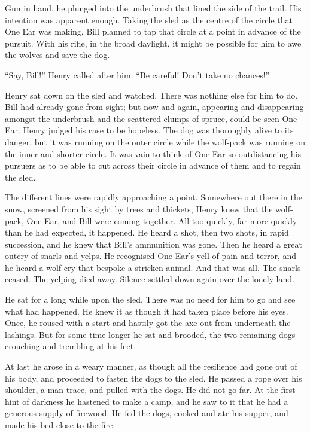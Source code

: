 \documentclass[10pt]{book}
\begin{document}
Gun in hand, he plunged into the underbrush that lined the side of the
trail. His intention was apparent enough. Taking the sled as the centre
of the circle that One Ear was making, Bill planned to tap that circle
at a point in advance of the pursuit. With his rifle, in the broad
daylight, it might be possible for him to awe the wolves and save the
dog.

“Say, Bill!” Henry called after him. “Be careful! Don’t take no
chances!”

Henry sat down on the sled and watched. There was nothing else for him
to do. Bill had already gone from sight; but now and again, appearing
and disappearing amongst the underbrush and the scattered clumps of
spruce, could be seen One Ear. Henry judged his case to be hopeless.
The dog was thoroughly alive to its danger, but it was running on the
outer circle while the wolf-pack was running on the inner and shorter
circle. It was vain to think of One Ear so outdistancing his pursuers
as to be able to cut across their circle in advance of them and to
regain the sled.

The different lines were rapidly approaching a point. Somewhere out
there in the snow, screened from his sight by trees and thickets, Henry
knew that the wolf-pack, One Ear, and Bill were coming together. All
too quickly, far more quickly than he had expected, it happened. He
heard a shot, then two shots, in rapid succession, and he knew that
Bill’s ammunition was gone. Then he heard a great outcry of snarls and
yelps. He recognised One Ear’s yell of pain and terror, and he heard a
wolf-cry that bespoke a stricken animal. And that was all. The snarls
ceased. The yelping died away. Silence settled down again over the
lonely land.

He sat for a long while upon the sled. There was no need for him to go
and see what had happened. He knew it as though it had taken place
before his eyes. Once, he roused with a start and hastily got the axe
out from underneath the lashings. But for some time longer he sat and
brooded, the two remaining dogs crouching and trembling at his feet.

At last he arose in a weary manner, as though all the resilience had
gone out of his body, and proceeded to fasten the dogs to the sled. He
passed a rope over his shoulder, a man-trace, and pulled with the dogs.
He did not go far. At the first hint of darkness he hastened to make a
camp, and he saw to it that he had a generous supply of firewood. He
fed the dogs, cooked and ate his supper, and made his bed close to the
fire.
\end{document}
